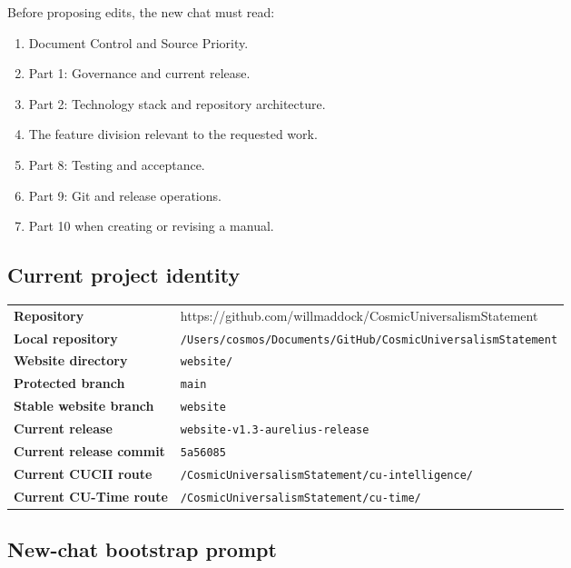 \documentclass[11pt,letterpaper]{article}
\newcommand{\RepositoryURL}{https://github.com/willmaddock/CosmicUniversalismStatement}
\newcommand{\filepath}[1]{\nolinkurl{#1}}
\newcommand{\branchname}[1]{\texttt{#1}}
\newcommand{\release}[1]{\texttt{#1}}
\begin{document}
Before proposing edits, the new chat must read:

\begin{enumerate}
    \item Document Control and Source Priority.
    \item Part 1: Governance and current release.
    \item Part 2: Technology stack and repository architecture.
    \item The feature division relevant to the requested work.
    \item Part 8: Testing and acceptance.
    \item Part 9: Git and release operations.
    \item Part 10 when creating or revising a manual.
\end{enumerate}

\subsection*{Current project identity}

\begin{tabularx}{\textwidth}{>{\bfseries}L{1.85in}Y}
Repository & \RepositoryURL \\
Local repository & \filepath{/Users/cosmos/Documents/GitHub/CosmicUniversalismStatement} \\
Website directory & \filepath{website/} \\
Protected branch & \branchname{main} \\
Stable website branch & \branchname{website} \\
Current release & \release{website-v1.3-aurelius-release} \\
Current release commit & \release{5a56085} \\
Current CUCII route & \filepath{/CosmicUniversalismStatement/cu-intelligence/} \\
Current CU-Time route & \filepath{/CosmicUniversalismStatement/cu-time/} \\
\end{tabularx}

\subsection*{New-chat bootstrap prompt}
\end{document}
